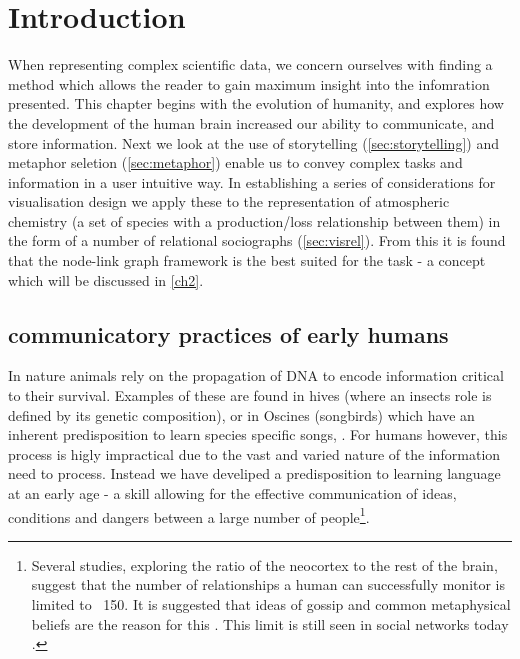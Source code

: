 

\section{Introduction}\label{sec:visbg}

When representing complex scientific data, we concern ourselves with finding a method which allows the reader to gain maximum insight into the infomration presented. This chapter begins with the evolution of humanity, and explores how the development of the human brain increased our ability to communicate, and store information. Next we look at the use of storytelling (\autoref{sec:storytelling}) and metaphor seletion (\autoref{sec:metaphor}) enable us to convey complex tasks and information in a user intuitive way. In establishing a series of considerations for visualisation design we apply these to the representation of atmospheric chemistry (a set of species with a production/loss relationship between them) in the form of a number of relational sociographs (\autoref{sec:visrel}). From this it is found that the node-link graph framework is the best suited for the task - a concept which will be discussed in \autoref{ch2}.

\subsection{communicatory practices of early humans}

In nature animals rely on the propagation of DNA to encode information critical to their survival. Examples of these are found in hives (where an insects role is defined by its genetic composition), or in Oscines (songbirds) which have an inherent predisposition to learn species specific songs, \citep{modelingpythonbees,genomics,birds,birdsongs,sapiens}. For humans however, this process is higly impractical due to the vast and varied nature of the information need to process. Instead we have develiped a predisposition to learning language at an early age - a skill allowing for the effective communication of ideas, conditions and dangers between a large number of people\footnote{Several studies, exploring the ratio of the neocortex to the rest of the brain, suggest that the number of relationships a human can successfully monitor is limited to ~150. It is suggested that ideas of gossip and common metaphysical beliefs are the reason for this \citep{sapiens,neo,gossip}. This limit is still seen in social networks today \citep{social}.}.

